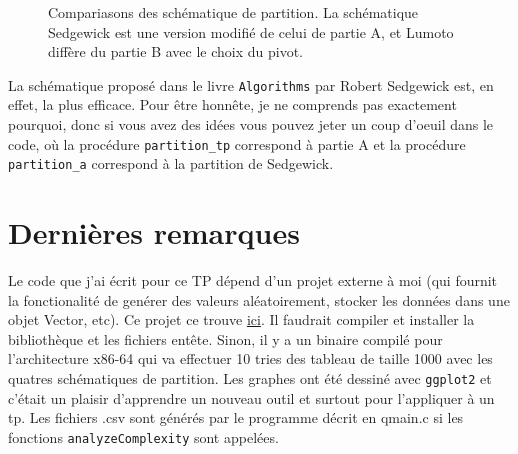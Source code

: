 \documentclass[10pt]{article} %
\begin{document}
\begin{figure}[h!]
    \centering
    \resizebox{.95\textwidth}{!}{
        
    }
    \caption{Compariasons des schématique de partition. La schématique Sedgewick est une version modifié de celui de partie A, et Lumoto diffère du partie B
    avec le choix du pivot.}
\end{figure}

La schématique proposé dans le livre \texttt{Algorithms} par Robert Sedgewick est, en effet, la plus efficace. Pour être honnête, je ne comprends pas exactement
pourquoi, donc si vous avez des idées vous pouvez jeter un coup d'oeuil dans le code, où la procédure \texttt{partition\_tp} correspond à partie A et la procédure
\texttt{partition\_a} correspond à la partition de Sedgewick.

\section*{Dernières remarques}

Le code que j'ai écrit pour ce TP dépend d'un projet externe à moi (qui fournit la fonctionalité de genérer des valeurs aléatoirement, stocker les données dans une objet Vector, etc).
Ce projet ce trouve \href{https://github.com/ejovo13/Informatique-TP}{ici}. Il faudrait compiler et installer la bibliothèque et les fichiers entête. Sinon, il y a un binaire compilé pour l'architecture x86-64 qui va effectuer 10 tries des tableau de
taille 1000 avec les quatres schématiques de partition. Les graphes ont été dessiné avec \texttt{ggplot2} et c'était un plaisir d'apprendre un nouveau outil et surtout
pour l'appliquer à un tp. Les fichiers .csv sont générés par le programme décrit en qmain.c si les fonctions \texttt{analyzeComplexity} sont appelées.
\end{document}
